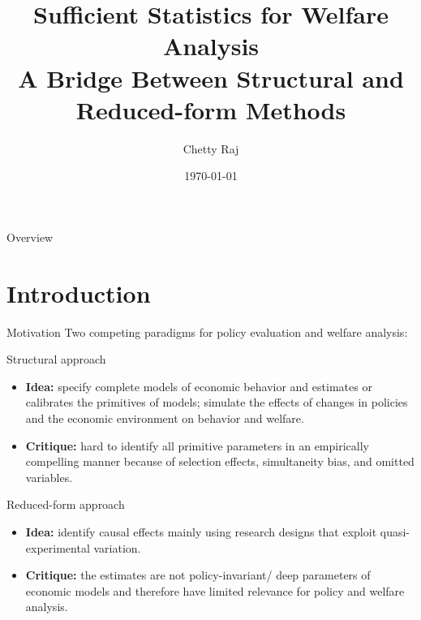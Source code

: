 \documentclass{beamer}
\title[Annu. Rev. Econ, 2009]{Sufficient Statistics for Welfare Analysis \\ {\small A Bridge Between Structural and Reduced-form Methods}}
\author{Chetty Raj}
\institute[]{Presenter: Qinzhu Sun}
\date{\today}
\begin{document}
\begin{frame}
	\titlepage
\end{frame}

\begin{frame}{Overview}
	\tableofcontents
\end{frame}
\section{Introduction}
\begin{frame}[shrink]
	\transfade %
	\tableofcontents[sectionstyle=show/shaded,subsectionstyle=show/shaded/hide]
	\addtocounter{framenumber}{-1}
\end{frame}
\begin{frame}{Motivation}
	Two competing paradigms for policy evaluation and welfare analysis:
	\begin{block}{Structural approach}
		\begin{itemize}
			\item \textbf{Idea:} specify complete models of economic behavior and estimates or calibrates the primitives of models; simulate the effects of changes in policies and the economic environment on behavior and welfare.
			\item \textbf{Critique:} hard to identify all primitive parameters in an empirically compelling manner because of selection effects, simultaneity bias, and omitted variables.
		\end{itemize}
	\end{block}
	\begin{block}{Reduced-form approach}
		\begin{itemize}
			\item \textbf{Idea:} identify causal effects mainly using research	designs that exploit quasi-experimental variation.
			\item \textbf{Critique:} the estimates are not policy-invariant/ deep parameters of economic models and therefore have limited relevance for policy and welfare analysis.
		\end{itemize}
	\end{block}
\end{frame}
\end{document}
